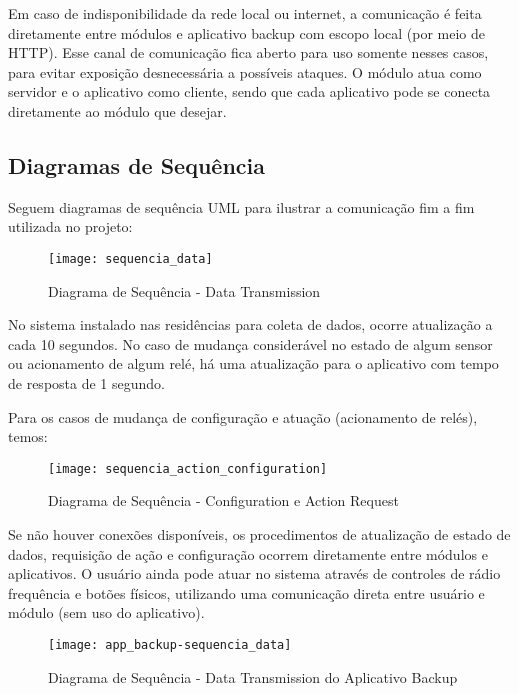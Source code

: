 Em caso de indisponibilidade da rede local ou internet, a comunicação é feita diretamente entre módulos e aplicativo backup com escopo local (por meio de HTTP). Esse canal de comunicação fica aberto para uso somente nesses casos, para evitar exposição desnecessária a possíveis ataques. O módulo atua como servidor e o aplicativo como cliente, sendo que cada aplicativo pode se conecta diretamente ao módulo que desejar.

\subsection{Diagramas de Sequência}

Seguem diagramas de sequência UML para ilustrar a comunicação fim a fim utilizada no projeto:

\begin{figure}[H]
	\centering
	\caption{Diagrama de Sequência - Data Transmission}
	\texttt{[image: sequencia\_data]}
	\label{fig:sequencia_data}
\end{figure}

No sistema instalado nas residências para coleta de dados, ocorre atualização a cada 10 segundos. No caso de mudança considerável no estado de algum sensor ou acionamento de algum relé, há uma atualização para o aplicativo com tempo de resposta de 1 segundo.

Para os casos de mudança de configuração e atuação (acionamento de relés), temos:

\begin{figure}[H]
	\centering
	\caption{Diagrama de Sequência - Configuration e Action Request}
	\texttt{[image: sequencia\_action\_configuration]}
	\label{fig:sequencia_action_configuration}
\end{figure}

Se não houver conexões disponíveis, os procedimentos de atualização de estado de dados, requisição de ação e configuração ocorrem diretamente entre módulos e aplicativos. O usuário ainda pode atuar no sistema através de controles de rádio frequência e botões físicos, utilizando uma comunicação direta entre usuário e módulo (sem uso do aplicativo).

\begin{figure}[H]
	\centering
	\caption{Diagrama de Sequência - Data Transmission do Aplicativo Backup}
	\texttt{[image: app\_backup-sequencia\_data]}
	\label{fig:app_backup-sequencia_data}
\end{figure}

